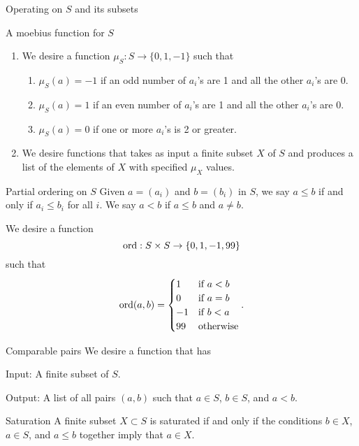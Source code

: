 \documentclass{article}
\begin{document}
\begin{section}{Operating on $S$ and its subsets}

\begin{subsubsection}{A moebius function for $S$}
\begin{enumerate}
\item We desire a function $\mu_S : S\rightarrow \{0, 1, -1\}$ such that 
\begin{enumerate}
\item  $\mu_S(a) = -1$ if an odd number of $a_i$'s are 1 and all the other $a_i$'s are 0.  
\item  $\mu_S(a) = 1$ if an even number of $a_i$'s are 1 and all the other $a_i$'s are 0. 
\item $\mu_S(a) = 0$ if one or more $a_i$'s is 2 or greater. 

\end{enumerate}



\item We desire  functions that  takes as input a finite subset $X$ of $S$ and produces a list of the elements of $X$ with specified $\mu_X$ values. 
\end{enumerate}
\end{subsubsection}

\begin{subsubsection}{Partial ordering on $S$}
Given $a= (a_i)$ and $b=(b_i)$ in $S$, we say $a\le b$ if and only if $a_i\le b_i$ for all $i$. We say $a< b$ if $a\le b$ and $a\ne b$.

We desire a function 
$$\hbox{ord}: S\times S \rightarrow \{0, 1, -1, 99\}$$ such that 
$$\hbox{ord}(a, b)= \begin{cases} 1 &  \hbox{if } a<  b \cr   0&\hbox{if } a=b\cr  -1 & \hbox{if } b<a  \cr 
99& \hbox{otherwise}\end{cases}.$$

\end{subsubsection}

\begin{subsubsection}{Comparable pairs}
We desire a function that has 

Input:  A finite subset of $S$.

Output: A list of all pairs $(a, b)$ such that $a\in S$, $b\in S$, and $a<b$.  

\end{subsubsection}

\begin{subsubsection}{Saturation}
 A finite subset $X \subset S$ is saturated if and only if  
 the conditions  $b \in X$, $a\in S$,  and $a\le b$ together imply that $a\in X$.  
 

\end{subsubsection}
\end{section}
\end{document}
